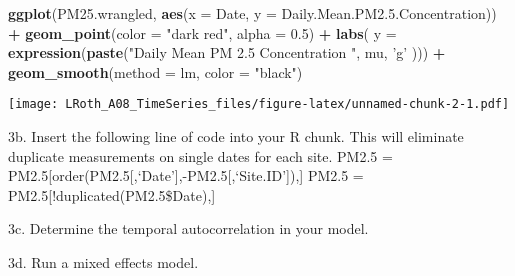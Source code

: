 \documentclass[]{article}
\newenvironment{Shaded}{\begin{snugshade}}{\end{snugshade}}
\newcommand{\KeywordTok}[1]{\textcolor[rgb]{0.13,0.29,0.53}{\textbf{#1}}}
\newcommand{\DataTypeTok}[1]{\textcolor[rgb]{0.13,0.29,0.53}{#1}}
\newcommand{\DecValTok}[1]{\textcolor[rgb]{0.00,0.00,0.81}{#1}}
\newcommand{\FloatTok}[1]{\textcolor[rgb]{0.00,0.00,0.81}{#1}}
\newcommand{\StringTok}[1]{\textcolor[rgb]{0.31,0.60,0.02}{#1}}
\newcommand{\OperatorTok}[1]{\textcolor[rgb]{0.81,0.36,0.00}{\textbf{#1}}}
\newcommand{\NormalTok}[1]{#1}
\begin{document}
\begin{Shaded}
\begin{Highlighting}[]
\KeywordTok{ggplot}\NormalTok{(PM25.wrangled, }\KeywordTok{aes}\NormalTok{(}\DataTypeTok{x =}\NormalTok{ Date, }\DataTypeTok{y =}\NormalTok{ Daily.Mean.PM2.}\FloatTok{5.}\NormalTok{Concentration)) }\OperatorTok{+}\StringTok{ }
\StringTok{  }\KeywordTok{geom_point}\NormalTok{(}\DataTypeTok{color =} \StringTok{"dark red"}\NormalTok{, }\DataTypeTok{alpha =} \FloatTok{0.5}\NormalTok{) }\OperatorTok{+}
\StringTok{  }\KeywordTok{labs}\NormalTok{( }\DataTypeTok{y =} \KeywordTok{expression}\NormalTok{(}\KeywordTok{paste}\NormalTok{(}\StringTok{"Daily Mean PM 2.5 Concentration "}\NormalTok{, mu, }\StringTok{'g'}\NormalTok{ ))) }\OperatorTok{+}
\StringTok{  }\KeywordTok{geom_smooth}\NormalTok{(}\DataTypeTok{method =}\NormalTok{ lm, }\DataTypeTok{color =} \StringTok{"black"}\NormalTok{)}
\end{Highlighting}
\end{Shaded}

\texttt{[image: LRoth\_A08\_TimeSeries\_files/figure-latex/unnamed-chunk-2-1.pdf]}

3b. Insert the following line of code into your R chunk. This will
eliminate duplicate measurements on single dates for each site. PM2.5 =
PM2.5{[}order(PM2.5{[},`Date'{]},-PM2.5{[},`Site.ID'{]}),{]} PM2.5 =
PM2.5{[}!duplicated(PM2.5\$Date),{]}

3c. Determine the temporal autocorrelation in your model.

3d. Run a mixed effects model.

\begin{Shaded}
\end{Shaded}
\end{document}
